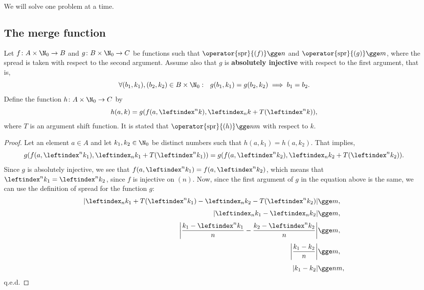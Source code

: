 \documentclass[12pt, a4paper]{article}
\newcommand{\spr}[1]{\operator{\mathrm{spr}}{\left(#1\right)}}
\newcommand{\lli}[1]{\leftindex_{#1}}
\newcommand{\lui}[1]{\leftindex^{#1}}
\begin{document}
We will solve one problem at a time.

\subsection{The merge function}

\begin{proposition}\label{comp}
    Let $ f \colon A \times \N_0 \to B $ and $ g \colon B \times \N_0 \to C $ be functions such that $ \spr{f} \gge n $ and $ \spr{g} \gge m $, where the spread is taken with respect to the second argument. Assume also that $ g $ is \textbf{absolutely injective} with respect to the first argument, that is,
    \[ \forall (b_1, k_1), (b_2, k_2) \in B \times \N_0: \ \ g(b_1, k_1) = g(b_2, k_2) \implies b_1 = b_2. \] 
    Define the function $ h \colon A \times \N_0 \to C $ by
    \[ h(a, k) = g(f(a, \lui{n}k), \lli{n}k + T(\lui{n}k)), \]
    where $ T $ is an argument shift function. It is stated that $ \spr{h} \gge nm $ with respect to $ k $.
\end{proposition}
\begin{proof}
    Let an element $ a \in A $ and let $ k_1, k_2 \in \N_0 $ be distinct numbers such that $ h(a, k_1) = h(a, k_2) $. That implies,
    \[ g(f(a, \lui{n}k_1), \lli{n}k_1 + T(\lui{n}k_1)) = g(f(a, \lui{n}k_2), \lli{n}k_2 + T(\lui{n}k_2)). \]
    Since $ g $ is absolutely injective, we see that $ f(a, \lui{n}k_1) = f(a, \lui{n}k_2) $, which means that $ \lui{n}k_1 = \lui{n}k_2 $, since $ f $ is injective on $ (n) $. Now, since the first argument of $ g $ in the equation above is the same, we can use the definition of spread for the function $ g $:
    \begin{align*}
        |\lli{n}k_1 + T(\lui{n}k_1) - \lli{n}k_2 - T(\lui{n}k_2)| &\gge m,\\[1mm]
        | \lli{n}k_1 - \lli{n}k_2 | &\gge m,\\[1mm]
        \left| \frac{k_1 - \lui{n}k_1}{n} - \frac{k_2 - \lui{n}k_2}{n} \right| &\gge m,\\[1mm]
        \left| \frac{k_1 - k_2}{n} \right| &\gge m,\\[1mm]
        |k_1 - k_2| &\gge nm,
    \end{align*}
    q.e.d.
\end{proof}
\end{document}
